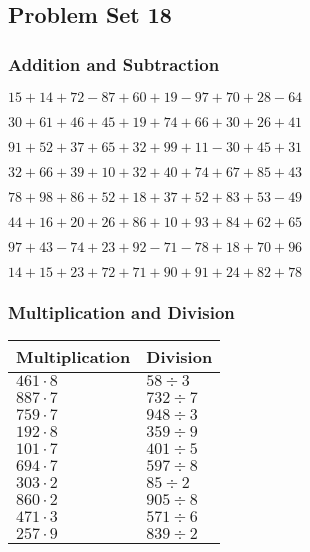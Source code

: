\hypertarget{problem-set-18}{%
\subsection{Problem Set 18}\label{problem-set-18}}

\hypertarget{addition-and-subtraction}{%
\subsubsection{Addition and
Subtraction}\label{addition-and-subtraction}}

\(15+14+72-87+60+19-97+70+28-64\)

\(30+61+46+45+19+74+66+30+26+41\)

\(91+52+37+65+32+99+11-30+45+31\)

\(32+66+39+10+32+40+74+67+85+43\)

\(78+98+86+52+18+37+52+83+53-49\)

\(44+16+20+26+86+10+93+84+62+65\)

\(97+43-74+23+92-71-78+18+70+96\)

\(14+15+23+72+71+90+91+24+82+78\)

\hypertarget{multiplication-and-division}{%
\subsubsection{Multiplication and
Division}\label{multiplication-and-division}}

\begin{longtable}[]{@{}ll@{}}
\toprule
Multiplication & Division\tabularnewline
\midrule
\endhead
\(461\cdot8\) & \(58÷3\)\tabularnewline
\(887\cdot7\) & \(732÷7\)\tabularnewline
\(759\cdot7\) & \(948÷3\)\tabularnewline
\(192\cdot8\) & \(359÷9\)\tabularnewline
\(101\cdot7\) & \(401÷5\)\tabularnewline
\(694\cdot7\) & \(597÷8\)\tabularnewline
\(303\cdot2\) & \(85÷2\)\tabularnewline
\(860\cdot2\) & \(905÷8\)\tabularnewline
\(471\cdot3\) & \(571÷6\)\tabularnewline
\(257\cdot9\) & \(839÷2\)\tabularnewline
\bottomrule
\end{longtable}
